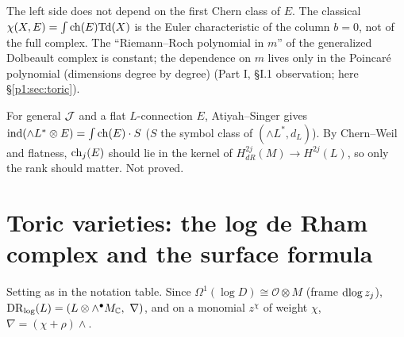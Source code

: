 \begin{rem}[Meaning\ \tP]
The left side does not depend on the first Chern class of $E$. The classical $\chi(X,E)=\int\mathrm{ch}(E)\mathrm{Td}(X)$ is the Euler characteristic of the column $b=0$, not of the full complex. The ``Riemann--Roch polynomial in $m$'' of the generalized Dolbeault complex is constant; the dependence on $m$ lives only in the Poincar\'e polynomial (dimensions degree by degree) (Part I, \S I.1 observation; here \S\ref{p1:sec:toric}).
\end{rem}
\begin{rem}
For general $\mathcal J$ and a flat $L$-connection $E$, Atiyah--Singer gives $\mathrm{ind}(\wedge L^*\otimes E)=\int\mathrm{ch}(E)\cdot S$ ($S$ the symbol class of $(\wedge L^*,d_L)$). By Chern--Weil and flatness, $\mathrm{ch}_j(E)$ should lie in the kernel of $H^{2j}_{dR}(M)\to H^{2j}(L)$, so only the rank should matter. Not proved.
\end{rem}

\section{Toric varieties: the log de Rham complex and the surface formula}\label{p2:sec:toric}
Setting as in the notation table. Since $\Omega^1(\log D)\cong\mathcal O\otimes M$ (frame $\mathrm{dlog}\, z_j$), $\mathrm{DR}_{\log}(L)=(L\otimes\wedge^\bullet M_\mathbb C,\ \nabla)$, and on a monomial $z^\chi$ of weight $\chi$, $\nabla=(\chi+\rho)\wedge$.

